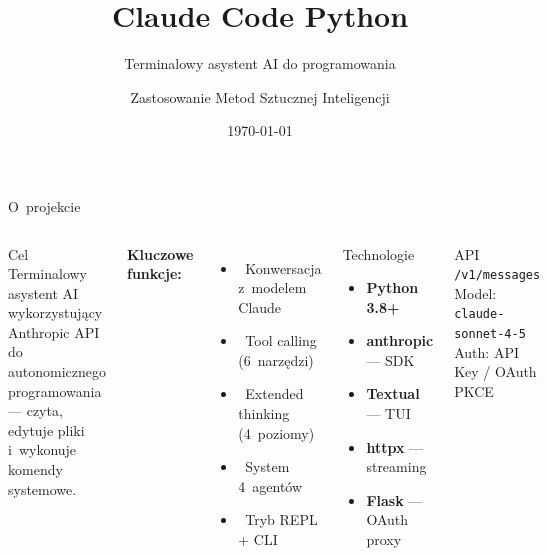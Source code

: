 \documentclass[aspectratio=169]{beamer}
\title{Claude Code Python}
\subtitle{Terminalowy asystent AI do programowania}
\author{Zastosowanie Metod Sztucznej Inteligencji}
\date{\today}
\institute{}
\begin{document}
\begin{frame}
    \titlepage
\end{frame}

\begin{frame}{O~projekcie}
    \begin{columns}[T]
        \begin{block}{Cel}
            Terminalowy asystent AI wykorzystujący Anthropic API
            do autonomicznego programowania --- czyta, edytuje pliki
            i~wykonuje komendy systemowe.
        \end{block}

        \vspace{0.2cm}
        \textbf{Kluczowe funkcje:}
        \begin{itemize}\setlength{\itemsep}{1pt}
            \item \faRobot\ Konwersacja z~modelem Claude
            \item \faTools\ Tool calling (6~narzędzi)
            \item \faBrain\ Extended thinking (4~poziomy)
            \item \faUsersCog\ System 4~agentów
            \item \faTerminal\ Tryb REPL + CLI
        \end{itemize}

        \begin{block}{Technologie}
            \begin{itemize}\setlength{\itemsep}{1pt}
                \item \textbf{Python 3.8+}
                \item \textbf{anthropic} --- SDK
                \item \textbf{Textual} --- TUI
                \item \textbf{httpx} --- streaming
                \item \textbf{Flask} --- OAuth proxy
            \end{itemize}
        \end{block}

        \vspace{0.2cm}
        \begin{block}{API}
            \texttt{/v1/messages}\\
            Model: \texttt{claude-sonnet-4-5}\\
            Auth: API Key / OAuth PKCE
        \end{block}
    \end{columns}
\end{frame}
\end{document}
